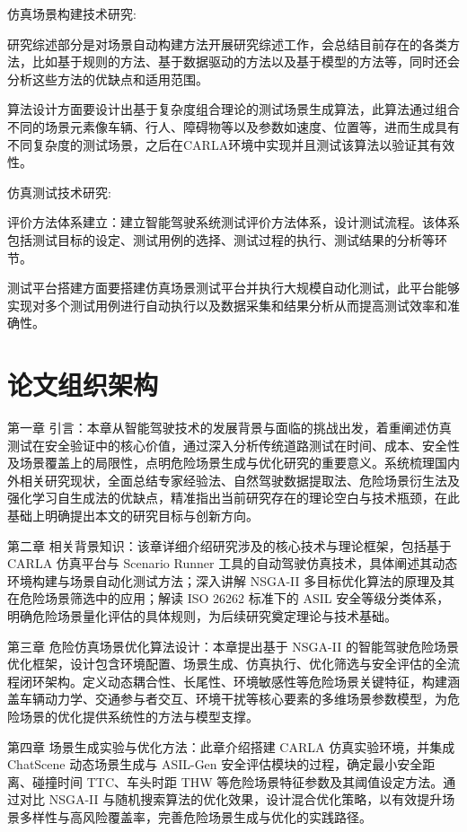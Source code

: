 仿真场景构建技术研究:

研究综述部分是对场景自动构建方法开展研究综述工作，会总结目前存在的各类方法，比如基于规则的方法、基于数据驱动的方法以及基于模型的方法等，同时还会分析这些方法的优缺点和适用范围\cite{najm2003analysis}。

算法设计方面要设计出基于复杂度组合理论的测试场景生成算法，此算法通过组合不同的场景元素像车辆、行人、障碍物等以及参数如速度、位置等，进而生成具有不同复杂度的测试场景，之后在CARLA环境中实现并且测试该算法以验证其有效性\cite{najm2007pre}。

仿真测试技术研究:

评价方法体系建立：建立智能驾驶系统测试评价方法体系，设计测试流程。该体系包括测试目标的设定、测试用例的选择、测试过程的执行、测试结果的分析等环节。

测试平台搭建方面要搭建仿真场景测试平台并执行大规模自动化测试，此平台能够实现对多个测试用例进行自动执行以及数据采集和结果分析从而提高测试效率和准确性\cite{苏江平2017基于中国危险工况的行人交通冲突典型场景提取与分析}。



\section{论文组织架构}

第一章 引言：本章从智能驾驶技术的发展背景与面临的挑战出发，着重阐述仿真测试在安全验证中的核心价值，通过深入分析传统道路测试在时间、成本、安全性及场景覆盖上的局限性，点明危险场景生成与优化研究的重要意义。系统梳理国内外相关研究现状，全面总结专家经验法、自然驾驶数据提取法、危险场景衍生法及强化学习自生成法的优缺点，精准指出当前研究存在的理论空白与技术瓶颈，在此基础上明确提出本文的研究目标与创新方向。

第二章 相关背景知识：该章详细介绍研究涉及的核心技术与理论框架，包括基于 CARLA 仿真平台与 Scenario Runner 工具的自动驾驶仿真技术，具体阐述其动态环境构建与场景自动化测试方法；深入讲解 NSGA-II 多目标优化算法的原理及其在危险场景筛选中的应用；解读 ISO 26262 标准下的 ASIL 安全等级分类体系，明确危险场景量化评估的具体规则，为后续研究奠定理论与技术基础。

第三章 危险仿真场景优化算法设计：本章提出基于 NSGA-II 的智能驾驶危险场景优化框架，设计包含环境配置、场景生成、仿真执行、优化筛选与安全评估的全流程闭环架构。定义动态耦合性、长尾性、环境敏感性等危险场景关键特征，构建涵盖车辆动力学、交通参与者交互、环境干扰等核心要素的多维场景参数模型，为危险场景的优化提供系统性的方法与模型支撑。

第四章 场景生成实验与优化方法：此章介绍搭建 CARLA 仿真实验环境，并集成 ChatScene 动态场景生成与 ASIL-Gen 安全评估模块的过程，确定最小安全距离、碰撞时间 TTC、车头时距 THW 等危险场景特征参数及其阈值设定方法。通过对比 NSGA-II 与随机搜索算法的优化效果，设计混合优化策略，以有效提升场景多样性与高风险覆盖率，完善危险场景生成与优化的实践路径。

